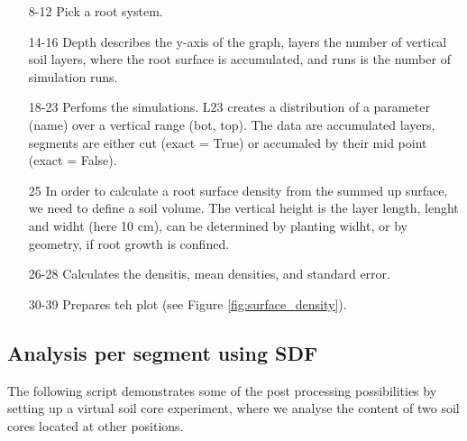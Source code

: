 \documentclass[a4paper]{article}
\begin{document}
\begin{itemize}

\item[8-12] Pick a root system.
\item[14-16] Depth describes the y-axis of the graph, layers the number of vertical soil layers, where the root surface is accumulated, and runs is the number of simulation runs. 
\item[18-23] Perfoms the simulations. L23 creates a distribution of a parameter (name) over a vertical range (bot, top). The data are accumulated layers, segments are either cut (exact = True) or accumaled by their mid point (exact = False). 
\item[25] In order to calculate a root surface density from the summed up surface, we need to define a soil volume. The vertical height is the layer length, lenght and widht (here 10 cm), can be determined by planting widht, or by geometry, if root growth is confined. 
\item[26-28] Calculates the densitis, mean densities, and standard error. 
\item[30-39] Prepares teh plot (see Figure \ref{fig:surface_density}).

\end{itemize}



\subsection{Analysis per segment using SDF}

The following script demonstrates some of the post processing possibilities by setting up a virtual soil core experiment, where we analyse the content of two soil cores located at other positions.


\end{document}
